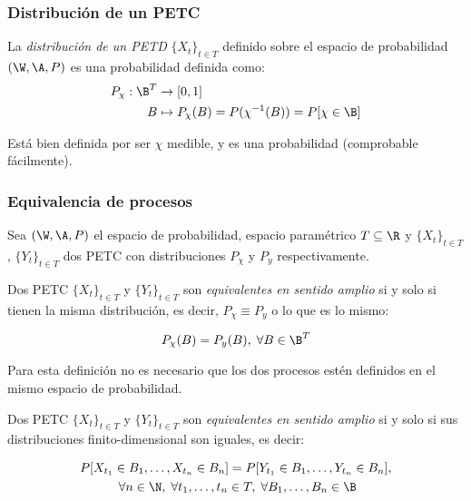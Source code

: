 \subsubsection{Distribución de un PETC}

\begin{ndef}
  La \emph{distribución de un PETD} $\{X_t\}_{t \in T}$ definido sobre el espacio de probabilidad $(\W, \A, P)$ es una probabilidad definida como:
  \begin{align*}
    P_\chi : \B^T & \to [0, 1] \\
    B & \mapsto P_\chi(B) = P(\chi^{-1}(B)) = P[\chi \in \B]
  \end{align*}
\end{ndef}

Está bien definida por ser $\chi$ medible, y es una probabilidad (comprobable fácilmente).


\subsubsection{Equivalencia de procesos}

Sea $(\W, \A, P)$ el espacio de probabilidad, espacio paramétrico $T \subseteq \R$ y $\{X_t\}_{t \in T}$, $\{Y_t\}_{t \in T}$ dos PETC con distribuciones $P_\chi$ y $P_y$ respectivamente.

\begin{ndef}
  Dos PETC $\{X_t\}_{t \in T}$ y $\{Y_t\}_{t \in T}$ son \emph{equivalentes en sentido amplio} si y solo si tienen la misma distribución, es decir, $P_\chi \equiv P_y$ o lo que es lo mismo:

  $$P_\chi(B) = P_y(B), \; \forall B \in \B^T$$
\end{ndef}

Para esta definición no es necesario que los dos procesos estén definidos en el mismo espacio de probabilidad.

\begin{nprop}
    Dos PETC $\{X_t\}_{t \in T}$ y $\{Y_t\}_{t \in T}$ son \emph{equivalentes en sentido amplio} si y solo si sus distribuciones finito-dimensional son iguales, es decir:

    \begin{multline*}
      P[X_{t_1} \in B_1, \ldots, X_{t_n} \in B_n] = P[Y_{t_1} \in B_1, \ldots, Y_{t_n} \in B_n], \\
      \; \forall n \in \N, \; \forall t_1, \ldots, t_n \in T, \; \forall B_1, \ldots, B_n \in \B
    \end{multline*}
\end{nprop}

